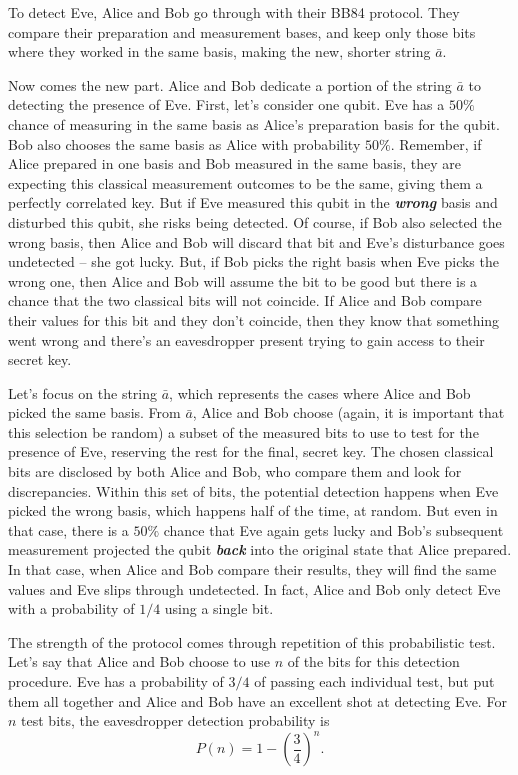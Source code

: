 To detect Eve, Alice and Bob go through with their BB84 protocol.
They compare their preparation and measurement bases, and keep only those bits where they worked in the same basis, making the new, shorter string $\bar{a}$.

Now comes the new part.
Alice and Bob dedicate a portion of the string $\bar{a}$ to detecting the presence of Eve.
First, let's consider one qubit.
Eve has a $50\%$ chance of measuring in the same basis as Alice's preparation basis for the qubit.
Bob also chooses the same basis as Alice with probability $50\%$. Remember, if Alice prepared in one basis and Bob measured in the same basis, they are expecting this classical measurement outcomes to be the same, giving them a perfectly correlated key. But if Eve measured this qubit in the \textbf{\emph{wrong}} basis and disturbed this qubit, she risks being detected.
Of course, if Bob also selected the wrong basis, then Alice and Bob will discard that bit and Eve's disturbance goes undetected -- she got lucky.
But, if Bob picks the right basis when Eve picks the wrong one, then Alice and Bob will assume the bit to be good but there is a chance that the two classical bits will not coincide. If Alice and Bob compare their values for this bit and they don't coincide, then they know that something went wrong and there's an eavesdropper present trying to gain access to their secret key.  

Let's focus on the string $\bar{a}$, which represents the cases where Alice and Bob picked the same basis. 
From $\bar{a}$, Alice and Bob choose (again, it is important that this selection be random) a subset of the measured bits to use to test for the presence of Eve, reserving the rest for the final, secret key.
The chosen classical bits are disclosed by both Alice and Bob, who compare them and look for discrepancies.
Within this set of bits, the potential detection happens when Eve picked the wrong basis, which happens half of the time, at random.
But even in that case, there is a $50\%$ chance that Eve again gets lucky and Bob's subsequent measurement projected the qubit \textbf{\emph{back}} into the original state that Alice prepared.
In that case, when Alice and Bob compare their results, they will find the same values and Eve slips through undetected.
In fact, Alice and Bob only detect Eve with a probability of $1/4$ using a single bit.

The strength of the protocol comes through repetition of this probabilistic test.
Let's say that Alice and Bob choose to use $n$ of the bits for this detection procedure.
Eve has a probability of $3/4$ of passing each individual test, but put them all together and Alice and Bob have an excellent shot at detecting Eve.
For $n$ test bits, the eavesdropper detection probability is
\begin{equation}
P(n)=1-\left(\frac{3}{4}\right)^n.
\end{equation}

